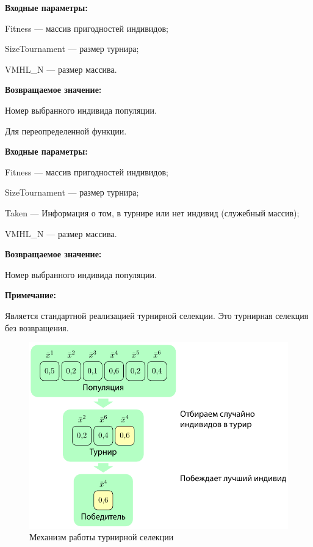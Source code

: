 \textbf{Входные параметры:}
 
 Fitness --- массив пригодностей индивидов;
 
 SizeTournament --- размер турнира;
 
 VMHL\_N --- размер массива.

\textbf{Возвращаемое значение:} 

 Номер выбранного индивида популяции.

 Для переопределенной функции.
 
 \textbf{Входные параметры:}
 
 Fitness --- массив пригодностей индивидов;
 
 SizeTournament --- размер турнира;
 
 Taken --- Информация о том, в турнире или нет индивид (служебный массив);
 
 VMHL\_N --- размер массива.

\textbf{Возвращаемое значение:} 

 Номер выбранного индивида популяции.
 
 \textbf{Примечание:}

 Является стандартной реализацией турнирной селекции. Это турнирная селекция без возвращения.
 
 \begin{figure} [h]
  \center
  \includegraphics [scale=0.8] {MHL_TournamentSelection_Sheme}
  \caption{Механизм работы турнирной селекции} 
  \label{img:MHL_TournamentSelection_Sheme}  
\end{figure}

